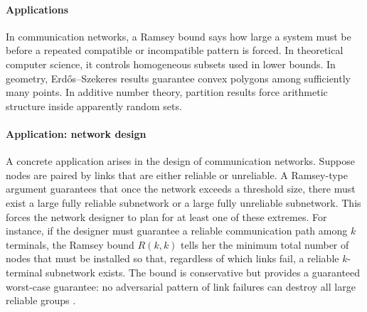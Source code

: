 \paragraph{Applications}
In communication networks, a Ramsey bound says how large a system must be before a repeated compatible or incompatible pattern is forced. In theoretical computer science, it controls homogeneous subsets used in lower bounds. In geometry, Erdős--Szekeres results guarantee convex polygons among sufficiently many points. In additive number theory, partition results force arithmetic structure inside apparently random sets.

\paragraph{Application: network design}
A concrete application arises in the design of communication networks. Suppose nodes are paired by links that are either reliable or unreliable. A Ramsey-type argument guarantees that once the network exceeds a threshold size, there must exist a large fully reliable subnetwork or a large fully unreliable subnetwork. This forces the network designer to plan for at least one of these extremes. For instance, if the designer must guarantee a reliable communication path among $k$ terminals, the Ramsey bound $R(k,k)$ tells her the minimum total number of nodes that must be installed so that, regardless of which links fail, a reliable $k$-terminal subnetwork exists. The bound is conservative but provides a guaranteed worst-case guarantee: no adversarial pattern of link failures can destroy all large reliable groups \cite{ramsey_ref1,ramsey_ref3}.

